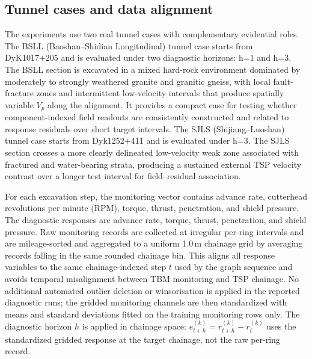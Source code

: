 \subsection{Tunnel cases and data alignment}
\label{sec:case_roles}

The experiments use two real tunnel cases with complementary evidential roles.
The BSLL (Baoshan--Shidian Longitudinal) tunnel case starts from DyK1017+205
and is evaluated under two diagnostic horizons: h=1 and h=3. The BSLL section
is excavated in a mixed hard-rock environment dominated by moderately to
strongly weathered granite and granitic gneiss, with local fault-fracture
zones and intermittent low-velocity intervals that produce spatially variable
$V_p$ along the alignment. It provides a compact case for testing whether
component-indexed field readouts are consistently constructed and related to response
residuals over short target intervals. The SJLS (Shijiang--Luoshan) tunnel
case starts from Dyk1252+411 and is evaluated under h=3. The SJLS section
crosses a more clearly delineated low-velocity weak zone associated with
fractured and water-bearing strata, producing a sustained external TSP
velocity contrast over a longer test interval for field--residual
association.

For each excavation step, the monitoring vector contains advance rate,
cutterhead revolutions per minute (RPM), torque, thrust, penetration, and
shield pressure. The diagnostic responses are advance rate, torque, thrust,
penetration, and shield pressure. Raw monitoring records are collected at
irregular per-ring intervals and are
mileage-sorted and aggregated to a uniform 1.0\,m chainage grid by averaging
records falling in the same rounded chainage bin. This aligns all response
variables to the same chainage-indexed step $t$ used by the graph sequence and
avoids temporal misalignment between TBM monitoring and TSP chainage. No
additional automated outlier deletion or winsorisation is applied in the
reported diagnostic runs; the gridded monitoring channels are then standardized
with means and standard deviations fitted on the training monitoring rows only.
The diagnostic horizon $h$ is applied in chainage space:
$e_{t+h}^{(k)}=r_{t+h}^{(k)}-r_t^{(k)}$ uses the standardized gridded response
at the target chainage, not the raw per-ring record.

